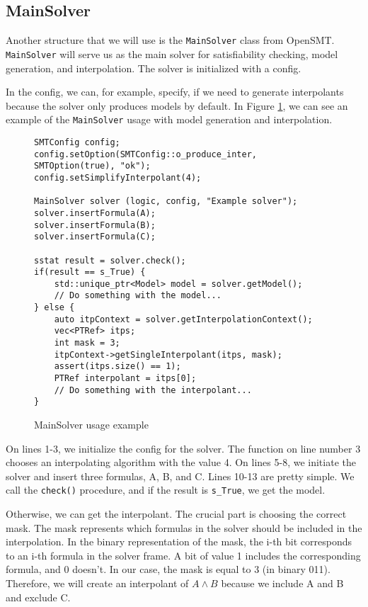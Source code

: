\subsection{MainSolver}
\noindent Another structure that we will use is the \texttt{MainSolver} class
from OpenSMT. \texttt{MainSolver} will serve us as the main solver for
satisfiability checking, model generation, and interpolation. The solver is
initialized with a config.

In the config, we can, for example, specify, if we need to generate
interpolants because the solver only produces models by default. In Figure
\ref{ex:MainSolver}, we can see an example
of the \texttt{MainSolver} usage with model generation and interpolation.

\begin{figure}[h]
\begin{lstlisting}
SMTConfig config;
config.setOption(SMTConfig::o_produce_inter, SMTOption(true), "ok");
config.setSimplifyInterpolant(4);

MainSolver solver (logic, config, "Example solver");
solver.insertFormula(A);
solver.insertFormula(B);
solver.insertFormula(C);

sstat result = solver.check();
if(result == s_True) {
    std::unique_ptr<Model> model = solver.getModel();
    // Do something with the model...
} else {
    auto itpContext = solver.getInterpolationContext();
    vec<PTRef> itps;
    int mask = 3;
    itpContext->getSingleInterpolant(itps, mask);
    assert(itps.size() == 1);
    PTRef interpolant = itps[0];
    // Do something with the interpolant...
}
\end{lstlisting}
\caption{MainSolver usage example}\label{ex:MainSolver}
\end{figure}
On lines 1-3, we initialize the config for the solver. The function on line
number 3 chooses an interpolating algorithm with the value 4. On lines 5-8, we
initiate the solver and insert three formulas, A, B, and C. Lines 10-13 are
pretty simple. We call the \texttt{check()} procedure, and if the result is
\texttt{s\_True}, we get the model.

Otherwise, we can get the interpolant. The crucial part is choosing the correct
mask. The mask represents which formulas in the solver should be included in
the interpolation. In the binary representation of the mask, the i-th bit
corresponds to an i-th formula in the solver frame. A bit of value 1 includes
the corresponding formula, and 0 doesn't. In our case, the mask is equal to 3
(in binary 011). Therefore, we will create an interpolant of $A \wedge B$
because we include A and B and exclude C.

